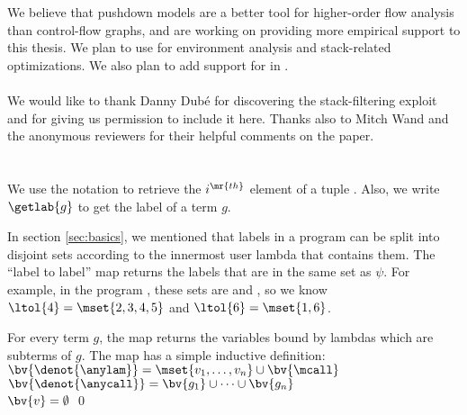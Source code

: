 \documentclass{LMCS}
\theoremstyle{definition} \newtheorem{property}[thm]{Property}
\begin{document}
We believe that pushdown models are a better tool for higher-order flow analysis
than control-flow graphs,
and are working on providing more empirical support to this thesis.
We plan to use \cfat{} for environment analysis and stack-related optimizations.
We also plan to add support for  in \cfat{}. 

\paragraph{}
We would like to thank Danny Dub\'e for discovering the stack-filtering exploit
and for giving us permission to include it here.
Thanks also to Mitch Wand and the anonymous reviewers for their helpful comments
on the paper.



\clearpage
\appendix

\section{}

\noindent We use the notation  to retrieve the $i^{\mr{th}}$
element of a tuple .
Also, we write $\getlab{g}$ to get the label of a term $g$.

In section \ref{sec:basics}, we mentioned that labels in a program can be split
into disjoint sets according to the innermost user lambda that contains them.
The ``label to label'' map \ltol{\psi} returns the labels that are in the same 
set as $\psi$.
For example, in the program , these sets are 
 and , so we know $\ltol{4} = \mset{2, 3, 4, 5}$ 
and $\ltol{6} = \mset{1, 6}$.

\begin{defi}
For every term $g$, the map  returns the variables bound by lambdas 
which are subterms of $g$.
The map has a simple inductive definition: \\
$\bv{\denot{\anylam}} =
\mset{v_1, \dots, v_n} \cup \bv{\mcall}$ \\
$\bv{\denot{\anycall}} = \bv{g_1} \cup \dots \cup \bv{g_n}$ \\
$\bv{v} = \emptyset$
\qed
\end{defi}
\end{document}
